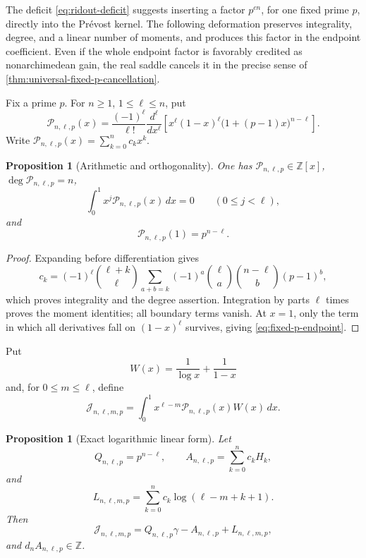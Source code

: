 \documentclass[11pt]{article}
\theoremstyle{keio}
\newtheorem{proposition}[theorem]{Proposition}
\theoremstyle{definition}
\theoremstyle{remark}
\newcommand{\Z}{\mathbb Z}
\begin{document}
The deficit \eqref{eq:ridout-deficit} suggests inserting a factor
\(p^{cn}\), for one fixed prime \(p\), directly into the Pr\'evost kernel.
The following deformation preserves integrality, degree, and a linear number
of moments, and produces this factor in the endpoint coefficient.  Even if
the whole endpoint factor is favorably credited as nonarchimedean gain, the
real saddle cancels it in the precise sense of
\cref{thm:universal-fixed-p-cancellation}.

Fix a prime \(p\).  For \(n\ge1\), \(1\le\ell\le n\), put
\begin{equation}\label{eq:fixed-p-rodrigues}
 \mathcal P_{n,\ell,p}(x)=
 \frac{(-1)^\ell}{\ell!}\frac{d^\ell}{dx^\ell}
 \left[x^\ell(1-x)^\ell
 \bigl(1+(p-1)x\bigr)^{n-\ell}\right].
\end{equation}
Write \(\mathcal P_{n,\ell,p}(x)=\sum_{k=0}^nc_kx^k\).

\begin{proposition}[Arithmetic and orthogonality]
\label{prop:fixed-p-arithmetic}
One has \(\mathcal P_{n,\ell,p}\in\Z[x]\),
\(\deg\mathcal P_{n,\ell,p}=n\),
\[
 \int_0^1x^j\mathcal P_{n,\ell,p}(x)\,dx=0
 \qquad(0\le j<\ell),
\]
and
\begin{equation}\label{eq:fixed-p-endpoint}
 \boxed{\mathcal P_{n,\ell,p}(1)=p^{n-\ell}.}
\end{equation}
\end{proposition}

\begin{proof}
Expanding before differentiation gives
\[
 c_k=(-1)^\ell\binom{\ell+k}{\ell}
 \sum_{a+b=k}(-1)^a
 \binom\ell a\binom{n-\ell}b(p-1)^b,
\]
which proves integrality and the degree assertion.  Integration by parts
\(\ell\) times proves the moment identities; all boundary terms vanish.
At \(x=1\), only the term in which all derivatives fall on
\((1-x)^\ell\) survives, giving \eqref{eq:fixed-p-endpoint}.
\end{proof}

Put
\[
 W(x)=\frac1{\log x}+\frac1{1-x}
\]
and, for \(0\le m\le\ell\), define
\begin{equation}\label{eq:fixed-p-moment}
 \mathcal J_{n,\ell,m,p}=
 \int_0^1x^{\ell-m}\mathcal P_{n,\ell,p}(x)W(x)\,dx.
\end{equation}

\begin{proposition}[Exact logarithmic linear form]
\label{prop:fixed-p-linear-form}
Let
\[
 Q_{n,\ell,p}=p^{n-\ell},
 \qquad
 A_{n,\ell,p}=\sum_{k=0}^nc_kH_k,
\]
and
\[
 L_{n,\ell,m,p}=
 \sum_{k=0}^nc_k\log(\ell-m+k+1).
\]
Then
\begin{equation}\label{eq:fixed-p-exact-form}
 \boxed{\mathcal J_{n,\ell,m,p}
 =Q_{n,\ell,p}\gamma-A_{n,\ell,p}+L_{n,\ell,m,p},}
\end{equation}
and \(d_nA_{n,\ell,p}\in\Z\).
\end{proposition}
\end{document}
